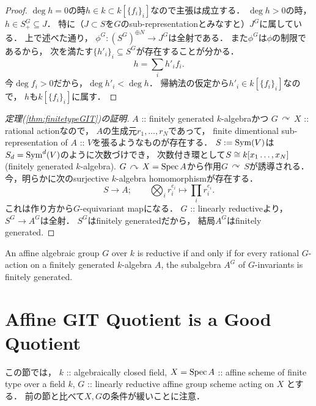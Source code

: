 \documentclass[a4paper]{jsarticle}
\newcommand{\acton}{\,\curvearrowright\,}
\begin{document}
\begin{proof}
        $\deg h=0$の時$h \in k \subset k[\{f_i\}_i]$なので主張は成立する．
        $\deg h>0$の時，$h \in S^G_+ \subseteq J$．
        特に（$J \subset S$を$G$のsub-representationとみなすと）$J^G$に属している．
        上で述べた通り，
        $\phi^G: (S^G)^{\oplus N} \to J^G$は全射である．
        また$\phi^G$は$\phi$の制限であるから，
        次を満たす$\{h'_i\}_i \subseteq S^G$が存在することが分かる．
        \[ h=\sum_i h'_if_i. \]
        今$\deg f_i>0$だから，$\deg h'_i<\deg h$．
        帰納法の仮定から$h'_i \in k[\{f_i\}_i]$なので，
        $h$も$k[\{f_i\}_i]$に属す．
    \end{proof}

    \begin{proof}[定理(\ref{thm:finitetypeGIT})の証明]
        $A$ :: finitely generated $k$-algebraかつ
        $G \acton X$ :: rational actionなので，
        $A$の生成元$r_1, \dots, r_N$であって，
        finite dimentional sub-representation of $A$ :: $V$を張るようなものが存在する．
        $S:=\operatorname{Sym}(V)$は$S_d=\operatorname{Sym}^d(V)$のように次数づけでき，
        次数付き環として$S \cong k[x_1\dots,x_N]$(finitely generated $k$-algebra).
        $G \acton X=\Spec A$から作用$G \acton S$が誘導される．
        今，明らかに次のsurjective $k$-algebra homomorphismが存在する．
        \[ S \to A; \qquad \bigotimes_i r_i^{e_i} \mapsto \prod_i r_i^{e_i}. \]
        これは作り方から$G$-equivariant mapになる．
        $G$ :: linearly reductiveより，
        $S^G \to A^G$は全射．
        $S^G$はfinitely generatedだから，
        結局$A^G$はfinitely generated.
    \end{proof}

    \begin{Thm}
        An affine algebraic group $G$ over $k$ is reductive
        if and only if
        for every rational $G$-action on a finitely generated $k$-algebra $A$,
        the subalgebra $A^G$ of $G$-invariants is finitely generated.
    \end{Thm}

\section{Affine GIT Quotient is a Good Quotient}
    この節では，
    $k$ :: algebraically closed field,
    $X=\operatorname{Spec} A$ :: affine scheme of finite type over a field $k$,
    $G$ :: linearly reductive affine group scheme acting on $X$
    とする．
    前の節と比べて$X, G$の条件が緩いことに注意．
\end{document}
